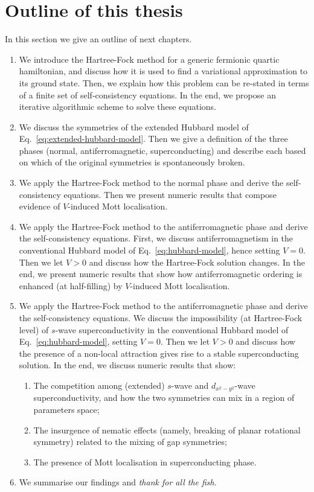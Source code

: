 \section{Outline of this thesis}\label{subsec:outline}

In this section we give an outline of next chapters.
\begin{enumerate}[align=left]
	\item[Chap.~\ref{chap:hf}] We introduce the Hartree-Fock method for a generic fermionic quartic hamiltonian, and discuss how it is used to find a variational approximation to its ground state. Then, we explain how this problem can be re-stated in terms of a finite set of self-consistency equations. In the end, we propose an iterative algorithmic scheme to solve these equations.
	\item[Chap.~\ref{chap:ehm-symmetries}] We discuss the symmetries of the extended Hubbard model of Eq.~\eqref{eq:extended-hubbard-model}. Then we give a definition of the three phases (normal, antiferromagnetic, superconducting) and describe each based on which of the original symmetries is spontaneously broken.
	\item[Chap.~\ref{chap:normal}] We apply the Hartree-Fock method to the normal phase and derive the self-consistency equations. Then we present numeric results that compose evidence of $V$-induced Mott localisation.
	\item[Chap.~\ref{chap:af}] We apply the Hartree-Fock method to the antiferromagnetic phase and derive the self-consistency equations. First, we discuss antiferromagnetism in the conventional Hubbard model of Eq.~\eqref{eq:hubbard-model}, hence setting $V=0$. Then we let $V>0$ and discuss how the Hartree-Fock solution changes. In the end, we present numeric results that show how antiferromagnetic ordering is enhanced (at half-filling) by $V$-induced Mott localisation.
	\item[Chap.~\ref{chap:sc}] We apply the Hartree-Fock method to the antiferromagnetic phase and derive the self-consistency equations. We discuss the impossibility (at Hartree-Fock level) of $s$-wave superconductivity in the conventional Hubbard model of Eq.~\eqref{eq:hubbard-model}, setting $V=0$. Then we let $V>0$ and discuss how the presence of a non-local attraction gives rise to a stable superconducting solution. In the end, we discuss numeric results that show:
	\begin{enumerate}
		\item The competition among (extended) $s$-wave and $d_{x^2-y^2}$-wave superconductivity, and how the two symmetries can mix in a region of parameters space;
		\item The insurgence of nematic effects (namely, breaking of planar rotational symmetry) related to the mixing of gap symmetries;
		\item The presence of Mott localisation in superconducting phase.
	\end{enumerate}
	\item[Chap.~\ref{chap:conclusions}] We summarise our findings and \textit{thank for all the fish}.
\end{enumerate}
